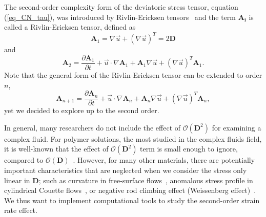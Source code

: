 The second-order complexity form of the deviatoric stress tensor, equation (\ref{eq_CN_tau}), was introduced by Rivlin-Ericksen tensors~\cite{rivlin_stress-deformation_1955} and
the term $\bm{A_i}$ is called a Rivlin-Ericksen tensor, defined as
\begin{equation}
   {\bm A_1}  = \nabla \vec{u} +  \left( \nabla \vec{u} \right)^T = 2 \bm{D} 
\end{equation}
and 
\begin{equation}
   \boldsymbol{A}_2
   =\frac{\partial \boldsymbol{A}_1}{\partial t} + \vec{u} \cdot \nabla \boldsymbol{A}_1+\boldsymbol{A}_1 \nabla \vec{u}+ \left(\nabla \vec{u} \right)^T \boldsymbol{A}_1.
\end{equation}
Note that the general form of the Rivlin-Ericksen tensor can be extended to order $n$,  
\begin{equation}
  \boldsymbol{A}_{n+1}
  =\frac{\partial \boldsymbol{A}_{n}}{\partial t} + \vec{u} \cdot \nabla \boldsymbol{A}_n+\boldsymbol{A}_n \nabla \vec{u}+ \left(\nabla \vec{u} \right)^T \boldsymbol{A}_n,
\end{equation}
yet we decided to explore up to the second order.
\par

\par
In general, many researchers do not include the effect of $\mathcal{O}\left( \bm{D}^2 \right)$ for examining a complex fluid. For polymer solutions, the most studied in the complex fluids field, it is well-known that the effect of  $\mathcal{O}\left( \bm{D}^2 \right)$ term is small enough to ignore, compared to  $\mathcal{O}\left( \bm{D} \right)$~\cite{bird_dynamics_1987}. However, for many other materials, there are potentially important characteristics that are neglected when we consider the stress only linear in $\boldsymbol{D}$; such as curvature in free-surface flows~\cite{couturier_suspensions_2011}, anomalous stress profile in cylindrical Couette flows~\cite{krishnaraj_dilation-driven_2016}, or negative rod climbing effect (Weissenberg effect)~\cite{boyer_dense_2011}. We thus want to implement computational tools to study the second-order strain rate effect.

